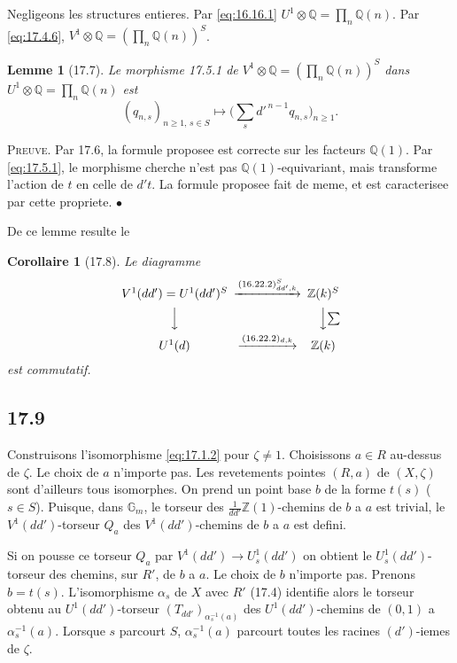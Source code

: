 \documentclass[12pt,a4paper]{article}
\theoremstyle{plain}
\newtheorem{lemma}[theorem]{Lemme}
\newtheorem{corollary}[theorem]{Corollaire}
\theoremstyle{definition}
\theoremstyle{remark}
\newcommand{\Gm}{\mathbb{G}_m}
\newcommand{\ZZ}{\mathbb{Z}}
\newcommand{\QQ}{\mathbb{Q}}
\begin{document}
Negligeons les structures entieres. Par \eqref{eq:16.16.1}
$U^1 \otimes \QQ = \prod_n \QQ(n)$. Par \eqref{eq:17.4.6},
$V^1 \otimes \QQ = (\prod_n \QQ(n))^S$.

\begin{lemma}[17.7]\label{lem:17.7}
Le morphisme 17.5.1 de
$V^1 \otimes \QQ = (\prod_n \QQ(n))^S$ dans
$U^1 \otimes \QQ = \prod_n \QQ(n)$ est
\[
(q_{n,s})_{n \geq 1,\, s \in S} \longmapsto
\bigl(\sum_s d'^{\,n-1} q_{n,s}\bigr)_{n \geq 1}.
\]
\end{lemma}

\noindent \textsc{Preuve.} Par 17.6, la formule proposee est correcte
sur les facteurs $\QQ(1)$. Par \eqref{eq:17.5.1}, le morphisme cherche
n'est pas $\QQ(1)$-equivariant, mais transforme l'action de $t$ en
celle de $d't$. La formule proposee fait de meme, et est caracterisee
par cette propriete. \hfill $\bullet$

De ce lemme resulte le

\begin{corollary}[17.8]\label{cor:17.8}
Le diagramme
\[
\begin{CD}
V^1(dd') = U^1(dd')^S @>{(16.22.2)_{dd',k}^S}>> \ZZ(k)^S \\
@VVV @VV{\sum}V \\
U^1(d) @>{(16.22.2)_{d,k}}>> \ZZ(k)
\end{CD}
\]
est commutatif.
\end{corollary}

\subsection{17.9}

Construisons l'isomorphisme \eqref{eq:17.1.2} pour $\zeta \neq 1$.
Choisissons $a \in R$ au-dessus de $\zeta$. Le choix de $a$ n'importe
pas. Les revetements pointes $(R,a)$ de $(X,\zeta)$ sont d'ailleurs
tous isomorphes. On prend un point base $b$ de la forme $t(s)$
($s \in S$). Puisque, dans $\Gm$, le torseur des
$\frac{1}{dd'}\ZZ(1)$-chemins de $b$ a $a$ est trivial, le
$V^1(dd')$-torseur $Q_a$ des $V^1(dd')$-chemins de $b$ a $a$ est
defini.

Si on pousse ce torseur $Q_a$ par $V^1(dd') \to U_s^1(dd')$ on
obtient le $U_s^1(dd')$-torseur des chemins, sur $R'$, de $b$ a $a$.
Le choix de $b$ n'importe pas. Prenons $b = t(s)$. L'isomorphisme
$\alpha_s$ de $X$ avec $R'$ (17.4) identifie alors le torseur obtenu
au $U^1(dd')$-torseur $(T_{dd'})_{\alpha_s^{-1}(a)}$ des
$U^1(dd')$-chemins de $(0,1)$ a $\alpha_s^{-1}(a)$. Lorsque $s$
parcourt $S$, $\alpha_s^{-1}(a)$ parcourt toutes les racines
$(d')$-iemes de $\zeta$.
\end{document}
